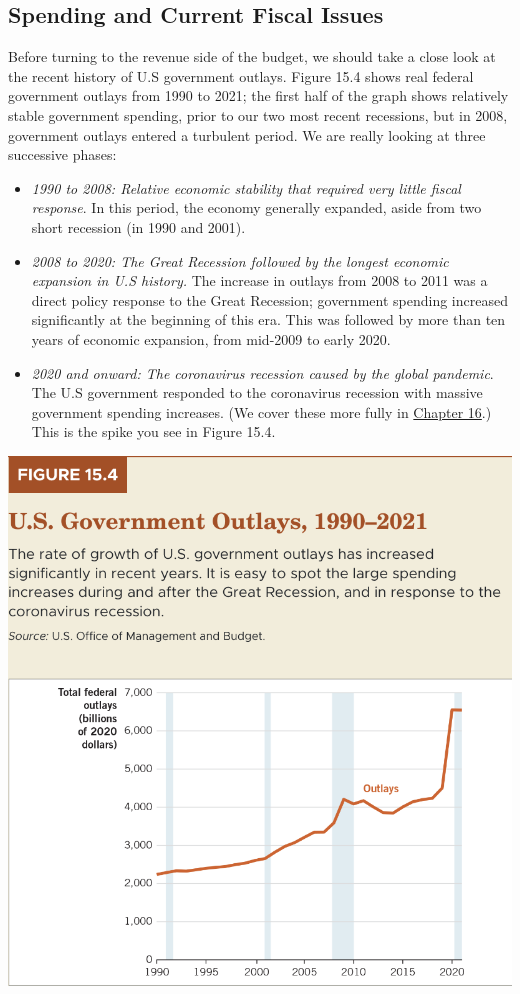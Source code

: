 \documentclass[11pt]{article} %
\begin{document}
\subsection*{Spending and Current Fiscal Issues}
Before turning to the revenue side of the budget, we should take a close look at the recent history of U.S government outlays. Figure 15.4 shows real federal government outlays from 1990 to 2021; the first half of the graph shows relatively stable government spending, prior to our two most recent recessions, but in 2008, government outlays entered a turbulent period. We are really looking at three successive phases:
\begin{itemize}
\item \textit{1990 to 2008: Relative economic stability that required very little fiscal response}. In this period, the economy generally expanded, aside from two short recession (in 1990 and 2001).
\item \textit{2008 to 2020: The Great Recession followed by the longest economic expansion in U.S history.} The increase in outlays from 2008 to 2011 was a direct policy response to the Great Recession; government spending increased significantly at the beginning of this era. This was followed by more than ten years of economic expansion, from mid-2009 to early 2020.
\item \textit{2020 and onward: The coronavirus recession caused by the global pandemic}. The U.S government responded to the coronavirus recession with massive government spending increases. (We cover these more fully in \underline{Chapter 16}.) This is the spike you see in Figure 15.4.
\end{itemize}

\begin{center}
\includegraphics[scale=0.5]{images/Figure 15.4.png} 
\end{center}
\end{document}
